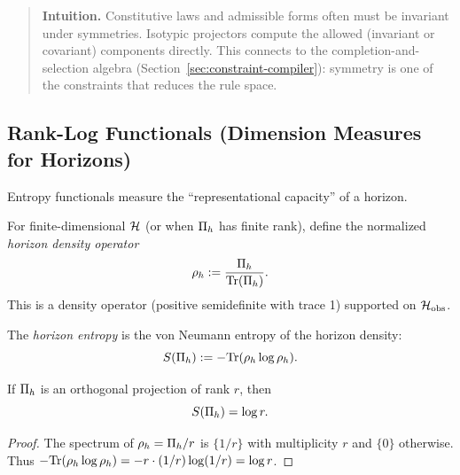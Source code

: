 \begin{quote}\small
\textbf{Intuition.}
Constitutive laws and admissible forms often must be invariant under symmetries.
Isotypic projectors compute the allowed (invariant or covariant) components directly.
This connects to the completion-and-selection algebra
(Section~\ref{sec:constraint-compiler}): symmetry is one of the constraints
that reduces the rule space.
\end{quote}

\subsection{Rank-Log Functionals (Dimension Measures for Horizons)}
\label{subsec:horizon-entropy}

Entropy functionals measure the ``representational capacity'' of a horizon.

\begin{definition}
\label{def:horizon-density}
For finite-dimensional $\mathcal{H}$ (or when $\Pi_{h}$ has finite rank), define the normalized \emph{horizon density operator}
\[
\rho_h := \frac{\Pi_{h}}{\mathrm{Tr}(\Pi_{h})}.
\]
This is a density operator (positive semidefinite with trace 1) supported on $\mathcal{H}_{\mathrm{obs}}$.
\end{definition}

\begin{definition}
\label{def:horizon-entropy}
The \emph{horizon entropy} is the von Neumann entropy of the horizon density:
\[
S(\Pi_{h}) := -\mathrm{Tr}(\rho_h \log \rho_h).
\]
\end{definition}

\begin{lemma}
\label{lem:projection-entropy}
If $\Pi_{h}$ is an orthogonal projection of rank $r$, then
\[
S(\Pi_{h}) = \log r.
\]
\end{lemma}

\begin{proof}
The spectrum of $\rho_h = \Pi_{h} / r$ is $\{1/r\}$ with multiplicity $r$ and $\{0\}$ otherwise.
Thus $-\mathrm{Tr}(\rho_h \log \rho_h) = -r \cdot (1/r) \log(1/r) = \log r$.
\end{proof}

